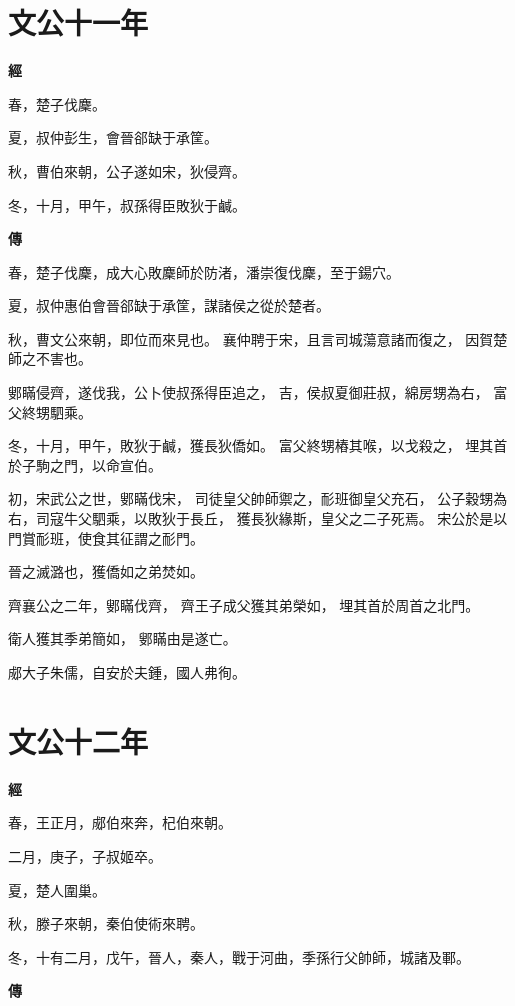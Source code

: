 \documentclass{ctexart}
\begin{document}
\section{文公十一年}


\textbf{經}



春，楚子伐麇。

夏，叔仲彭生，會晉郤缺于承筐。

秋，曹伯來朝，公子遂如宋，狄侵齊。

冬，十月，甲午，叔孫得臣敗狄于鹹。

\textbf{傳}



春，楚子伐麇，成大心敗麇師於防渚，潘崇復伐麇，至于鍚穴。

夏，叔仲惠伯會晉郤缺于承筐，謀諸侯之從於楚者。

秋，曹文公來朝，即位而來見也。
襄仲聘于宋，且言司城蕩意諸而復之，
因賀楚師之不害也。

鄋瞞侵齊，遂伐我，公卜使叔孫得臣追之，
吉，侯叔夏御莊叔，綿房甥為右，
富父終甥駟乘。

冬，十月，甲午，敗狄于鹹，獲長狄僑如。
富父終甥樁其喉，以戈殺之，
埋其首於子駒之門，以命宣伯。

初，宋武公之世，鄋瞞伐宋，
司徒皇父帥師禦之，耏班御皇父充石，
公子穀甥為右，司寇牛父駟乘，以敗狄于長丘，
獲長狄緣斯，皇父之二子死焉。
宋公於是以門賞耏班，使食其征謂之耏門。

晉之滅潞也，獲僑如之弟焚如。

齊襄公之二年，鄋瞞伐齊，
齊王子成父獲其弟榮如，
埋其首於周首之北門。

衛人獲其季弟簡如，
鄋瞞由是遂亡。

郕大子朱儒，自安於夫鍾，國人弗徇。





\section{文公十二年}


\textbf{經}



春，王正月，郕伯來奔，杞伯來朝。

二月，庚子，子叔姬卒。

夏，楚人圍巢。

秋，滕子來朝，秦伯使術來聘。

冬，十有二月，戊午，晉人，秦人，戰于河曲，季孫行父帥師，城諸及鄆。

\textbf{傳}
\end{document}
